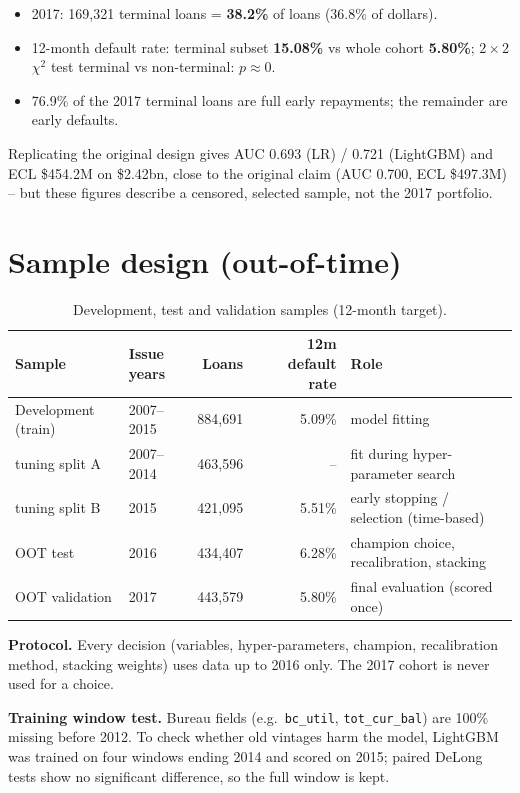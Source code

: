 \documentclass[11pt,a4paper]{article}
\newcommand{\1}{\mathbf{1}}
\begin{document}
\begin{itemize}[itemsep=1pt]
\item 2017: 169{,}321 terminal loans = \textbf{38.2\%} of loans (36.8\% of dollars).
\item 12-month default rate: terminal subset \textbf{15.08\%} vs whole cohort \textbf{5.80\%}; $2\times2$ $\chi^2$ test terminal vs non-terminal: $p\approx 0$.
\item 76.9\% of the 2017 terminal loans are full early repayments; the remainder are early defaults.
\end{itemize}
Replicating the original design gives AUC 0.693 (LR) / 0.721 (LightGBM) and ECL \$454.2M on \$2.42bn, close to the original claim (AUC 0.700, ECL \$497.3M) -- but these figures describe a censored, selected sample, not the 2017 portfolio.

\section{Sample design (out-of-time)}
\begin{table}[H]\centering\small
\caption{Development, test and validation samples (12-month target).}
\begin{tabular}{llrrl}
\toprule
Sample & Issue years & Loans & 12m default rate & Role\\
\midrule
Development (train) & 2007--2015 & 884{,}691 & 5.09\% & model fitting\\
\quad tuning split A & 2007--2014 & 463{,}596 & -- & fit during hyper-parameter search\\
\quad tuning split B & 2015 & 421{,}095 & 5.51\% & early stopping / selection (time-based)\\
OOT test & 2016 & 434{,}407 & 6.28\% & champion choice, recalibration, stacking\\
OOT validation & 2017 & 443{,}579 & 5.80\% & final evaluation (scored once)\\
\bottomrule
\end{tabular}
\end{table}

\textbf{Protocol.} Every decision (variables, hyper-parameters, champion, recalibration method, stacking weights) uses data up to 2016 only. The 2017 cohort is never used for a choice.

\textbf{Training window test.} Bureau fields (e.g.\ \texttt{bc\_util}, \texttt{tot\_cur\_bal}) are 100\% missing before 2012. To check whether old vintages harm the model, LightGBM was trained on four windows ending 2014 and scored on 2015; paired DeLong tests show no significant difference, so the full window is kept.
\begin{table}[H]\centering\small
\caption{Training-window experiment (fixed LightGBM parameters).}

\end{table}
\end{document}
